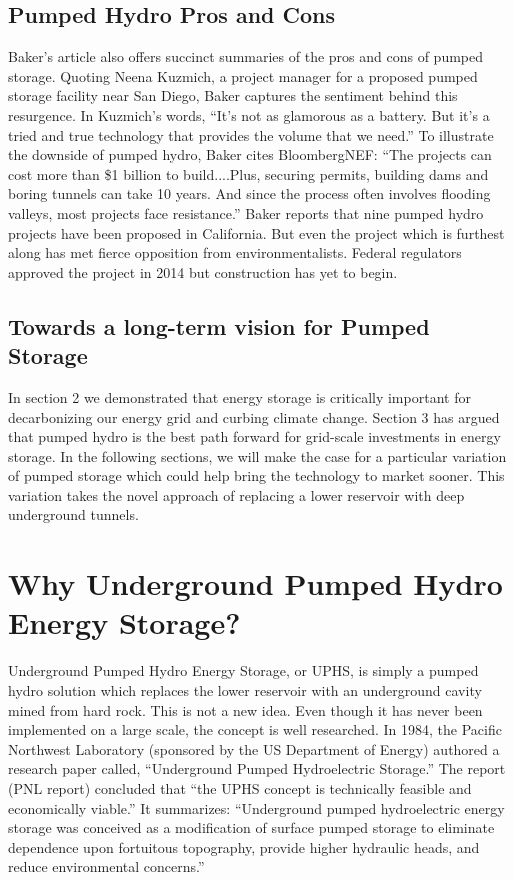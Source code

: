 \documentclass[hidelinks,12pt,a4paper]{article}
\begin{document}
\subsection{Pumped Hydro Pros and Cons}
Baker's article also offers succinct summaries of the pros and cons of pumped storage. Quoting Neena Kuzmich, a project manager for a proposed pumped storage facility near San Diego, Baker captures the sentiment behind this resurgence. In Kuzmich's words, “It’s not as glamorous as a battery. But it’s a tried and true technology that provides the volume that we need.” To illustrate the downside of pumped hydro, Baker cites BloombergNEF: “The projects can cost more than \$1 billion to build....Plus, securing permits, building dams and boring tunnels can take 10 years. And since the process often involves flooding valleys, most projects face resistance.” Baker reports that nine pumped hydro projects have been proposed in California. But even the project which is furthest along has met fierce opposition from environmentalists. Federal regulators approved the project in 2014 but construction has yet to begin. \cite{QuestforBiggerBatteries}

\subsection{Towards a long-term vision for Pumped Storage}
In section 2 we demonstrated that energy storage is critically important for decarbonizing our energy grid and curbing climate change. Section 3 has argued that pumped hydro is the best path forward for grid-scale investments in energy storage. In the following sections, we will make the case for a particular variation of pumped storage which could help bring the technology to market sooner. This variation takes the novel approach of replacing a lower reservoir with deep underground tunnels.

\pagebreak[4]
\section{Why Underground Pumped Hydro Energy Storage?}
Underground Pumped Hydro Energy Storage, or UPHS, is simply a pumped hydro solution which replaces the lower reservoir with an underground cavity mined from hard rock. This is not a new idea. Even though it has never been implemented on a large scale, the concept is well researched. In 1984, the Pacific Northwest Laboratory (sponsored by the US Department of Energy) authored a research paper called, “Underground Pumped Hydroelectric Storage.” The report (PNL report) concluded that “the UPHS concept is technically feasible and economically viable.” \cite{UndergroundPumpedHydroelectricStorage} It summarizes: “Underground pumped hydroelectric energy storage was conceived as a modification of surface pumped storage to eliminate dependence upon fortuitous topography, provide higher hydraulic heads, and reduce environmental concerns.” \cite{UndergroundPumpedHydroelectricStorage}
\end{document}
